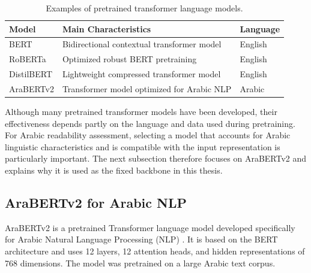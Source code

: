 \documentclass[12pt]{report}
\begin{document}
\begin{table}[H]

\centering

\caption{Examples of pretrained transformer language models.}

\label{tab:transformer_models}
\vspace{3mm}
\begin{tabular}{p{4cm} p{6.5cm} p{2.5cm}}

\toprule

\textbf{Model} & \textbf{Main Characteristics} & \textbf{Language} \\

\midrule

BERT & Bidirectional contextual transformer model & English \\

RoBERTa & Optimized robust BERT pretraining & English \\

DistilBERT & Lightweight compressed transformer model & English \\

AraBERTv2 & Transformer model optimized for Arabic NLP & Arabic \\

\bottomrule

\end{tabular}

\end{table}

Although many pretrained transformer models have been developed, their effectiveness depends partly on the language and data used during pretraining. For Arabic readability assessment, selecting a model that accounts for Arabic linguistic characteristics and is compatible with the input representation is particularly important. The next subsection therefore focuses on AraBERTv2 and explains why it is used as the fixed backbone in this thesis.


\subsection{AraBERTv2 for Arabic NLP}


AraBERTv2 is a pretrained Transformer language model developed specifically for Arabic Natural Language Processing (NLP) \cite{antoun2020arabert}. It is based on the BERT architecture and uses 12 layers, 12 attention heads, and hidden representations of 768 dimensions. The model was pretrained on a large Arabic text corpus.
\end{document}
